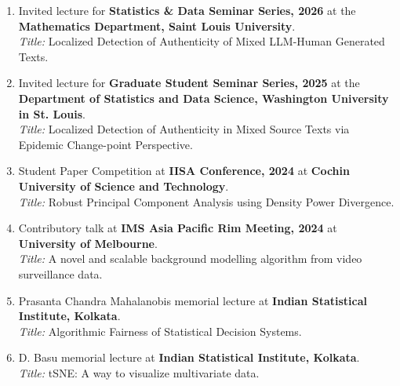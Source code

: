 \documentclass[11pt]{developercv} %
\begin{document}
\vspace*{-10pt}

\begin{enumerate}
    \item Invited lecture for \textbf{Statistics \& Data Seminar Series, 2026} at the \textbf{Mathematics Department, Saint Louis University}.\\
    \emph{Title:} Localized Detection of Authenticity of Mixed LLM-Human Generated Texts.
    \item Invited lecture for \textbf{Graduate Student Seminar Series, 2025} at the \textbf{Department of Statistics and Data Science, Washington University in St. Louis}.\\
    \emph{Title:} Localized Detection of Authenticity in Mixed Source Texts via Epidemic Change-point Perspective.
    \item Student Paper Competition at \textbf{IISA Conference, 2024} at \textbf{Cochin University of Science and Technology}. \\
    \emph{Title:} Robust Principal Component Analysis using Density Power Divergence.
    \item Contributory talk at \textbf{IMS Asia Pacific Rim Meeting, 2024} at \textbf{University of Melbourne}. \\
    \emph{Title:} A novel and scalable background modelling algorithm from video surveillance data.
    \item Prasanta Chandra Mahalanobis memorial lecture at \textbf{Indian Statistical Institute, Kolkata}.\\
    \emph{Title:} Algorithmic Fairness of Statistical Decision Systems.
    \item D. Basu memorial lecture at \textbf{Indian Statistical Institute, Kolkata}.\\
    \emph{Title:} tSNE: A way to visualize multivariate data.
\end{enumerate}

\end{document}
